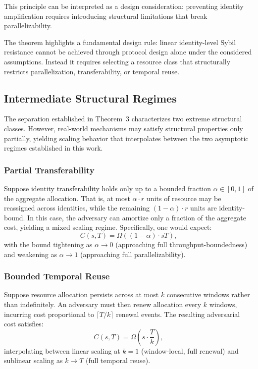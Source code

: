\documentclass[journal]{IEEEtran}
\begin{document}
	This principle can be interpreted as a design consideration:
	preventing identity amplification requires introducing structural
	limitations that break parallelizability.
	
	The theorem highlights a fundamental design rule:
	linear identity-level Sybil resistance cannot
	be achieved through protocol design alone under the considered assumptions.
	Instead it requires selecting a resource class
	that structurally restricts parallelization,
	transferability, or temporal reuse.
	\subsection{Intermediate Structural Regimes}
	
	The separation established in Theorem~3 characterizes two
	extreme structural classes. However, real-world mechanisms
	may satisfy structural properties only partially, yielding
	scaling behavior that interpolates between the two asymptotic
	regimes established in this work.
	
	\subsubsection*{Partial Transferability}
	Suppose identity transferability holds only up to a bounded
	fraction $\alpha \in [0,1]$ of the aggregate allocation.
	That is, at most $\alpha \cdot r$ units of resource may be
	reassigned across identities, while the remaining
	$(1-\alpha) \cdot r$ units are identity-bound.
	In this case, the adversary can amortize only a fraction
	of the aggregate cost, yielding a mixed scaling regime.
	Specifically, one would expect:
	\[
	C(s,T) = \Omega\!\left((1-\alpha) \cdot sT\right),
	\]
	with the bound tightening as $\alpha \to 0$ (approaching
	full throughput-boundedness) and weakening as $\alpha \to 1$
	(approaching full parallelizability).
	
	\subsubsection*{Bounded Temporal Reuse}
	Suppose resource allocation persists across at most $k$
	consecutive windows rather than indefinitely.
	An adversary must then renew allocation every $k$ windows,
	incurring cost proportional to $\lceil T/k \rceil$ renewal
	events. The resulting adversarial cost satisfies:
	\[
	C(s,T) = \Omega\!\left(s \cdot \frac{T}{k}\right),
	\]
	interpolating between linear scaling at $k=1$
	(window-local, full renewal) and sublinear scaling
	as $k \to T$ (full temporal reuse).
	
\end{document}
